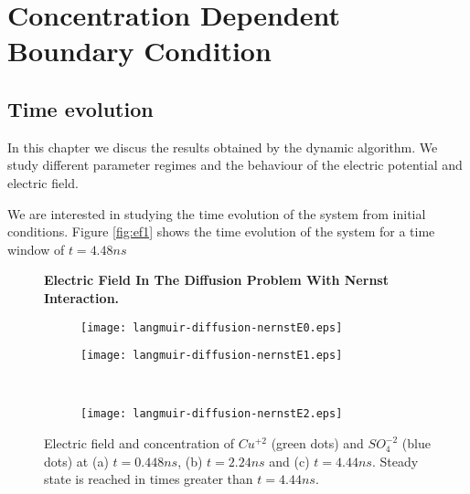 \section{Concentration Dependent Boundary Condition}
\label{ch:results-analysis}
\subsection{Time evolution}

In this chapter we discus the results obtained by the dynamic algorithm. We study different parameter regimes and the behaviour of the electric potential and electric field.

We are interested in studying the time evolution of the system from initial conditions. Figure \ref{fig:ef1} shows the time evolution of the system for a time window of $t = 4.48 ns$




\begin{figure}[htbp]
\centering
\textbf{Electric Field In The Diffusion Problem With Nernst Interaction.}\par\medskip
\begin{subfigure}{.5\linewidth}
\centering
\texttt{[image: langmuir-diffusion-nernstE0.eps]}
\caption{}
\label{fig:time-evol1_1}
\end{subfigure}%
\begin{subfigure}{.5\linewidth}
\centering
\texttt{[image: langmuir-diffusion-nernstE1.eps]}
\caption{}
\label{fig:time-evol1_2}
\end{subfigure}\\[1ex]
\begin{subfigure}{\linewidth}
\centering
\texttt{[image: langmuir-diffusion-nernstE2.eps]}
\caption{}
\label{fig:time-evol1_3}
\end{subfigure}
\caption{Electric field and concentration of $Cu^{+2}$ (green dots) and $SO_4^{-2}$ (blue dots) at (a) $t = 0.448 ns$, (b) $t = 2.24 ns$ and (c) $t = 4.44 ns$. Steady state is reached in times greater than $t = 4.44 ns$.}
\end{figure}

